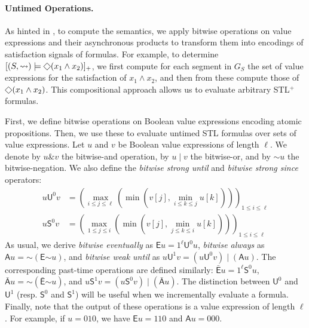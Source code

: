 \documentclass[iicol,lineno]{sn-jnl}
\renewcommand{\cref}{\Cref}
\newcommand{\hb}{\rightsquigarrow}
\newcommand*\BitAnd{\mathbin{\&}}
\newcommand*\BitOr{\mathbin{|}}
\newcommand*\BitNeg{\ensuremath{\mathord{\sim}}}
\renewcommand{\LTLf}{\LTLdiamond}
\let\LTLeventually\LTLf
\newcommand{\?}{\text{?}}
\begin{document}
	\paragraph*{Untimed Operations.}
	As hinted in \cref{ex:asyncprod}, to compute the semantics, we apply bitwise operations on value expressions and their asynchronous products to transform them into encodings of satisfaction signals of formulas.
	For example, to determine $[(S, {\hb}) \models \LTLeventually (x_1 \land x_2)]_+$, we first compute for each segment in $G_S$ the set of value expressions for the satisfaction of $x_1 \land x_2$, and then from these compute those of $\LTLeventually (x_1 \land x_2)$.
	This compositional approach allows us to evaluate arbitrary STL$^+$ formulas.
	
	First, we define bitwise operations on Boolean value expressions encoding atomic propositions.
	Then, we use these to evaluate untimed STL formulas over sets of value expressions.
	Let $u$ and $v$ be Boolean value expressions of length $\ell$.
	We denote by $u \BitAnd v$ the bitwise-and operation, by $u \BitOr v$ the bitwise-or, and by $\BitNeg u$ the bitwise-negation.
	We also define the \emph{bitwise strong until} and \emph{bitwise strong since} operators:
	\begin{align*}
		u \mathsf{U}^0 v &= \left( \max_{i \leq j \leq \ell} \left( \min \left( v[j], \min_{i \leq k \leq j} u[k] \right) \right) \right)_{1 \leq i \leq \ell} \\
		u \mathsf{S}^0 v &= \left( \max_{1 \leq j \leq i} \left( \min \left( v[j], \min_{j \leq k \leq i} u[k] \right) \right) \right)_{1 \leq i \leq \ell}
	\end{align*}
	As usual, we derive \emph{bitwise eventually} as 
	$\mathsf{E} u = 1^\ell \mathsf{U}^0 u$, \emph{bitwise always} as $\mathsf{A} u = \BitNeg 
	(\mathsf{E} \BitNeg u)$, and \emph{bitwise weak until} as $u \mathsf{U}^1 v = (u \mathsf{U}^0 v) 
	\BitOr (\mathsf{A} u)$.
	The corresponding past-time operations are defined similarly:
	$\bar{\mathsf{E}} u = 1^\ell \mathsf{S}^0 u$,
	$\bar{\mathsf{A}} u = \BitNeg (\bar{\mathsf{E}} \BitNeg u)$, and 
	$u \mathsf{S}^1 v = (u \mathsf{S}^0 v) \BitOr (\bar{\mathsf{A}} u)$.
	The distinction between $\mathsf{U}^0$ and $\mathsf{U}^1$ (resp. $\mathsf{S}^0$ and $\mathsf{S}^1$) will be useful when we incrementally evaluate a formula.
	Finally, note that the output of these operations is a value expression of length $\ell$.
	For example, if $u = 010$, we have $\mathsf{E} u = 110$ and $\mathsf{A} u = 000$.
	
\end{document}
